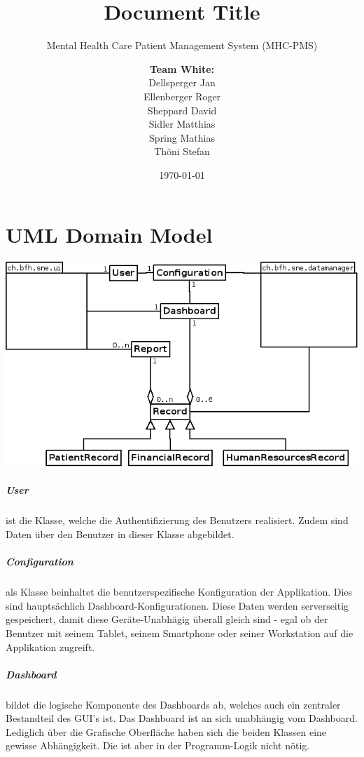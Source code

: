 \documentclass[a4paper]{scrreprt}
\title{Document Title}
\subtitle{Mental Health Care Patient Management System (MHC-PMS)}
\author{
\begin{tabular}{l}
\normalfont\bfseries{Team White:}\\
Dellsperger Jan\\
Ellenberger Roger\\
Sheppard David\\
Sidler Matthias\\
Spring Mathias\\
Thöni Stefan
\end{tabular}
}
\date{\today}
\begin{document}
\begin{titlepage}
	\maketitle
\end{titlepage}

\chapter{UML Domain Model}

\includegraphics[width=1\textwidth]{./class-diagram.png}

\paragraph{User} ist die Klasse, welche die Authentifizierung des Benutzers realisiert. Zudem sind  Daten über den Benutzer in dieser Klasse abgebildet.

\paragraph{Configuration} als Klasse beinhaltet die benutzerspezifische Konfiguration der Applikation. Dies sind hauptsächlich Dashboard-Konfigurationen. Diese Daten werden serverseitig gespeichert, damit diese Geräte-Unabhägig überall gleich sind - egal ob der Benutzer mit seinem Tablet, seinem Smartphone oder seiner Workstation auf die Applikation zugreift.

\paragraph{Dashboard} bildet die logische Komponente des Dashboards ab, welches auch ein zentraler Bestandteil des GUI's ist. Das Dashboard ist an sich unabhängig vom Dashboard. Lediglich über die Grafische Oberfläche haben sich die beiden Klassen eine gewisse Abhängigkeit. Die ist aber in der Programm-Logik nicht nötig.
\end{document}

